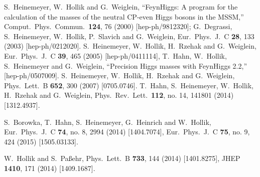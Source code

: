\documentclass[11pt]{article}
\begin{document}
\begin{thebibliography}{999}
S.~Heinemeyer, W.~Hollik and G.~Weiglein,
  ``FeynHiggs: A program for the calculation of the masses of the neutral
  CP-even Higgs bosons in the MSSM,''
  Comput.\ Phys.\ Commun.\  {\bf 124}, 76 (2000)
  [hep-ph/9812320];
G.~Degrassi, S.~Heinemeyer, W.~Hollik, P.~Slavich and G.~Weiglein,
  Eur.\ Phys.\ J.\ C {\bf 28}, 133 (2003)
  [hep-ph/0212020].
S.~Heinemeyer, W.~Hollik, H.~Rzehak and G.~Weiglein,
  Eur.\ Phys.\ J.\ C {\bf 39}, 465 (2005)
  [hep-ph/0411114],
T.~Hahn, W.~Hollik, S.~Heinemeyer and G.~Weiglein,
  ``Precision Higgs masses with FeynHiggs 2.2,''
  [hep-ph/0507009].
S.~Heinemeyer, W.~Hollik, H.~Rzehak and G.~Weiglein,
  Phys.\ Lett.\ B {\bf 652}, 300 (2007)
  [0705.0746].
T.~Hahn, S.~Heinemeyer, W.~Hollik, H.~Rzehak and G.~Weiglein,
  Phys.\ Rev.\ Lett.\  {\bf 112}, no. 14, 141801 (2014)
  [1312.4937].
    
  S.~Borowka, T.~Hahn, S.~Heinemeyer, G.~Heinrich and W.~Hollik,
  Eur.\ Phys.\ J.\ C {\bf 74}, no. 8, 2994 (2014)
  [1404.7074],
  Eur.\ Phys.\ J.\ C {\bf 75}, no. 9, 424 (2015)
  [1505.03133].

  W.~Hollik and S.~Pa{\ss}ehr,
  Phys.\ Lett.\ B {\bf 733}, 144 (2014)
  [1401.8275],
  JHEP {\bf 1410}, 171 (2014)
  [1409.1687].
      

\end{thebibliography}
\end{document}
